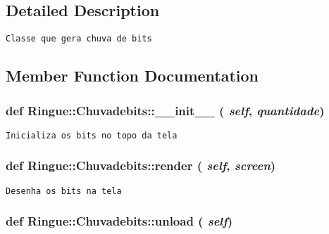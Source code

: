\subsection{Detailed Description}


\begin{footnotesize}\begin{verbatim}Classe que gera chuva de bits \end{verbatim}
\end{footnotesize}
 

\subsection{Member Function Documentation}
\hypertarget{class_ringue_1_1_chuvadebits_7e99a3eee40f22cd89b980afd6f255d8}{
\subsubsection[{\_\-\_\-init\_\-\_\-}]{\setlength{\rightskip}{0pt plus 5cm}def Ringue::Chuvadebits::\_\-\_\-init\_\-\_\- ( {\em self}, \/   {\em quantidade})}}
\label{class_ringue_1_1_chuvadebits_7e99a3eee40f22cd89b980afd6f255d8}




\begin{footnotesize}\begin{verbatim}Inicializa os bits no topo da tela \end{verbatim}
\end{footnotesize}
 \hypertarget{class_ringue_1_1_chuvadebits_ff26f1acc928e339c1436b247d7a1a66}{
\subsubsection[{render}]{\setlength{\rightskip}{0pt plus 5cm}def Ringue::Chuvadebits::render ( {\em self}, \/   {\em screen})}}
\label{class_ringue_1_1_chuvadebits_ff26f1acc928e339c1436b247d7a1a66}




\begin{footnotesize}\begin{verbatim}Desenha os bits na tela \end{verbatim}
\end{footnotesize}
 \hypertarget{class_ringue_1_1_chuvadebits_f6a88cb5585f0f52c66dce41a664d495}{
\subsubsection[{unload}]{\setlength{\rightskip}{0pt plus 5cm}def Ringue::Chuvadebits::unload ( {\em self})}}
\label{class_ringue_1_1_chuvadebits_f6a88cb5585f0f52c66dce41a664d495}




